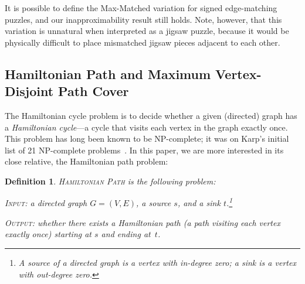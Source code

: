 \documentclass[11pt]{article}
\newtheorem{definition}{Definition}
\begin{document}
It is possible to define the Max-Matched variation for signed
edge-matching puzzles, and our inapproximability result still holds.
Note, however, that this variation is unnatural when interpreted as a
jigsaw puzzle, because it would be physically difficult to place mismatched
jigsaw pieces adjacent to each other.





\subsection{Hamiltonian Path and Maximum Vertex-Disjoint Path Cover}

The Hamiltonian cycle problem is to decide whether a given (directed) graph has a \emph{Hamiltonian cycle}---a cycle that visits each vertex in the graph exactly once. This problem has long been known to be NP-complete; it was on Karp's initial list of 21 NP-complete problems~\cite{Karp72}. In this paper, we are more interested in its close relative, the Hamiltonian path problem:

\begin{definition}
  \textsc{Hamiltonian Path} is the following problem:

  \textsc{Input:} a directed graph $G = (V, E)$, a source $s$, and a sink $t$.\footnote{A \emph{source} of a directed graph is a vertex with in-degree zero; a \emph{sink} is a vertex with out-degree zero.}

  \textsc{Output:} whether there exists a Hamiltonian path (a path visiting each vertex exactly once) starting at $s$ and ending at~$t$.
\end{definition}
\end{document}
